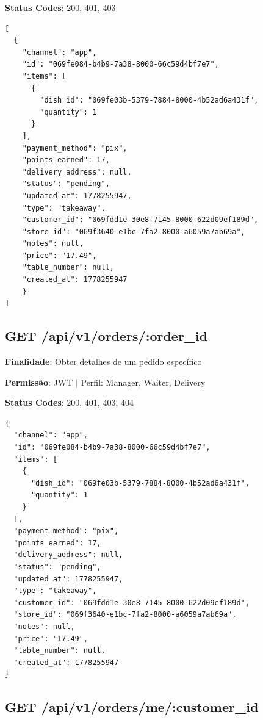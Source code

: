 \noindent\textbf{Status Codes}: 200, 401, 403

\begin{tcolorbox}[colback=green!5, colframe=black, title=\textbf{200 OK}]
\begin{verbatim}
[
  {
    "channel": "app",
    "id": "069fe084-b4b9-7a38-8000-66c59d4bf7e7",
    "items": [
      {
        "dish_id": "069fe03b-5379-7884-8000-4b52ad6a431f",
        "quantity": 1
      }
    ],
    "payment_method": "pix",
    "points_earned": 17,
    "delivery_address": null,
    "status": "pending",
    "updated_at": 1778255947,
    "type": "takeaway",
    "customer_id": "069fdd1e-30e8-7145-8000-622d09ef189d",
    "store_id": "069f3640-e1bc-7fa2-8000-a6059a7ab69a",
    "notes": null,
    "price": "17.49",
    "table_number": null,
    "created_at": 1778255947
    }
]
\end{verbatim}
\end{tcolorbox}

\subsection{GET /api/v1/orders/:order\_id}

\noindent\textbf{Finalidade}: Obter detalhes de um pedido específico

\noindent\textbf{Permissão}: JWT | Perfil: Manager, Waiter, Delivery

\noindent\textbf{Status Codes}: 200, 401, 403, 404

\begin{tcolorbox}[colback=green!5, colframe=black, title=\textbf{200 OK}]
\begin{verbatim}
{
  "channel": "app",
  "id": "069fe084-b4b9-7a38-8000-66c59d4bf7e7",
  "items": [
    {
      "dish_id": "069fe03b-5379-7884-8000-4b52ad6a431f",
      "quantity": 1
    }
  ],
  "payment_method": "pix",
  "points_earned": 17,
  "delivery_address": null,
  "status": "pending",
  "updated_at": 1778255947,
  "type": "takeaway",
  "customer_id": "069fdd1e-30e8-7145-8000-622d09ef189d",
  "store_id": "069f3640-e1bc-7fa2-8000-a6059a7ab69a",
  "notes": null,
  "price": "17.49",
  "table_number": null,
  "created_at": 1778255947
}
\end{verbatim}
\end{tcolorbox}

\subsection{GET /api/v1/orders/me/:customer\_id}

